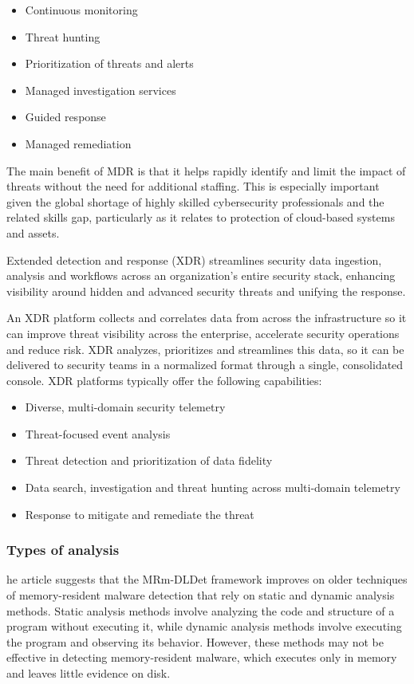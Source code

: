 \documentclass{article}
\begin{document}
\begin{itemize}
\item	Continuous monitoring
\item	Threat hunting
\item	Prioritization of threats and alerts
\item	Managed investigation services
\item	Guided response
\item	Managed remediation
\end{itemize}

The main benefit of MDR is that it helps rapidly identify and limit the impact of threats without the need for additional staffing. This is especially important given the global shortage of highly skilled cybersecurity professionals and the related skills gap, particularly as it relates to protection of cloud-based systems and assets.

Extended detection and response (XDR) streamlines security data ingestion, analysis and workflows across an organization’s entire security stack, enhancing visibility around hidden and advanced security threats and unifying the response.

An XDR platform collects and correlates data from across the infrastructure so it can improve threat visibility across the enterprise, accelerate security operations and reduce risk. XDR analyzes, prioritizes and streamlines this data, so it can be delivered to security teams in a normalized format through a single, consolidated console.
XDR platforms typically offer the following capabilities:

\begin{itemize}
\item	Diverse, multi-domain security telemetry
\item	Threat-focused event analysis
\item	Threat detection and prioritization of data fidelity
\item	Data search, investigation and threat hunting across multi-domain telemetry
\item	Response to mitigate and remediate the threat
\end{itemize}


\subsubsection{Types of analysis}
he article suggests that the MRm-DLDet framework improves on older techniques of memory-resident malware detection that rely on static and dynamic analysis methods. Static analysis methods involve analyzing the code and structure of a program without executing it, while dynamic analysis methods involve executing the program and observing its behavior. However, these methods may not be effective in detecting memory-resident malware, which executes only in memory and leaves little evidence on disk. 
\end{document}
